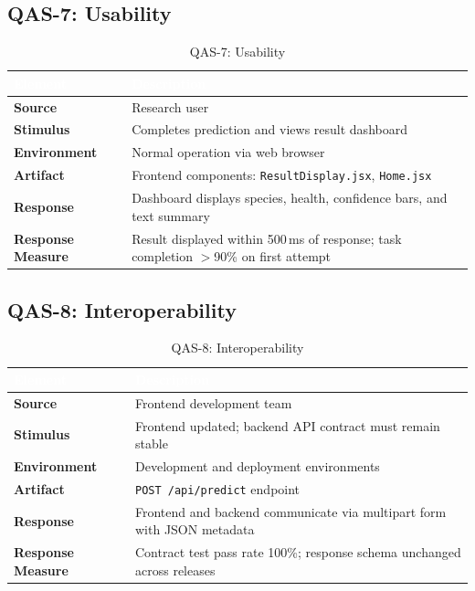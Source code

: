\documentclass[11pt,a4paper,oneside]{report}
\newcommand{\file}[1]{\texttt{\footnotesize #1}}
\newcommand{\code}[1]{\texttt{\footnotesize #1}}
\begin{document}
\subsection{QAS-7: Usability}
\begin{table}[H]
\centering\footnotesize
\caption{QAS-7: Usability}
\label{tab:qas-usa}
\begin{tabularx}{\textwidth}{>{\bfseries}p{2.5cm} X}
\toprule
\rowcolor{tableheader}
\textcolor{white}{Element} & \textcolor{white}{Description} \\
\midrule
Source          & Research user \\
Stimulus        & Completes prediction and views result dashboard \\
Environment     & Normal operation via web browser \\
Artifact        & Frontend components: \file{ResultDisplay.jsx}, \file{Home.jsx} \\
Response        & Dashboard displays species, health, confidence bars, and text summary \\
Response Measure & Result displayed within 500\,ms of response; task completion $>$90\% on first attempt \\
\bottomrule
\end{tabularx}
\end{table}

\subsection{QAS-8: Interoperability}
\begin{table}[H]
\centering\footnotesize
\caption{QAS-8: Interoperability}
\label{tab:qas-interop}
\begin{tabularx}{\textwidth}{>{\bfseries}p{2.5cm} X}
\toprule
\rowcolor{tableheader}
\textcolor{white}{Element} & \textcolor{white}{Description} \\
\midrule
Source          & Frontend development team \\
Stimulus        & Frontend updated; backend API contract must remain stable \\
Environment     & Development and deployment environments \\
Artifact        & \code{POST /api/predict} endpoint \\
Response        & Frontend and backend communicate via multipart form with JSON metadata \\
Response Measure & Contract test pass rate 100\%; response schema unchanged across releases \\
\bottomrule
\end{tabularx}
\end{table}
\end{document}
